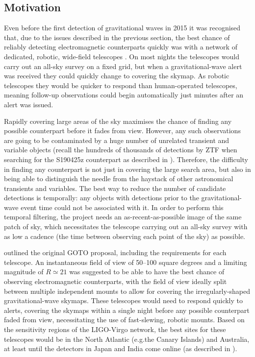 \subsection{Motivation}
\label{sec:goto_motivation}
\begin{colsection}

Even before the first detection of gravitational waves in 2015 it was recognised that, due to the issues described in the previous section, the best chance of reliably detecting electromagnetic counterparts quickly was with a network of dedicated, robotic, wide-field telescopes \citep{Darren}. On most nights the telescopes would carry out an all-sky survey on a fixed grid, but when a gravitational-wave alert was received they could quickly change to covering the skymap. As robotic telescopes they would be quicker to respond than human-operated telescopes, meaning follow-up observations could begin automatically just minutes after an alert was issued.

Rapidly covering large areas of the sky maximises the chance of finding any possible counterpart before it fades from view. However, any such observations are going to be contaminated by a huge number of unrelated transient and variable objects (recall the hundreds of thousands of detections by ZTF when searching for the S190425z counterpart as described in ). Therefore, the difficulty in finding any counterpart is not just in covering the large search area, but also in being able to distinguish the needle from the haystack of other astronomical transients and variables. The best way to reduce the number of candidate detections is temporally: any objects with detections prior to the gravitational-wave event time could not be associated with it. In order to perform this temporal filtering, the project needs an as-recent-as-possible image of the same patch of sky, which necessitates the telescope carrying out an all-sky survey with as low a cadence (the time between observing each point of the sky) as possible.

\citet{Darren} outlined the original GOTO proposal, including the requirements for each telescope. An instantaneous field of view of 50--100 square degrees and a limiting magnitude of $R\simeq21$ was suggested to be able to have the best chance of observing electromagnetic counterparts, with the field of view ideally split between multiple independent mounts to allow for covering the irregularly-shaped gravitational-wave skymaps. These telescopes would need to respond quickly to alerts, covering the skymaps within a single night before any possible counterpart faded from view, necessitating the use of fast-slewing, robotic mounts. Based on the sensitivity regions of the LIGO-Virgo network, the best sites for these telescopes would be in the North Atlantic (e.g.\@ the Canary Islands) and Australia, at least until the detectors in Japan and India come online (as described in ).

\end{colsection}

